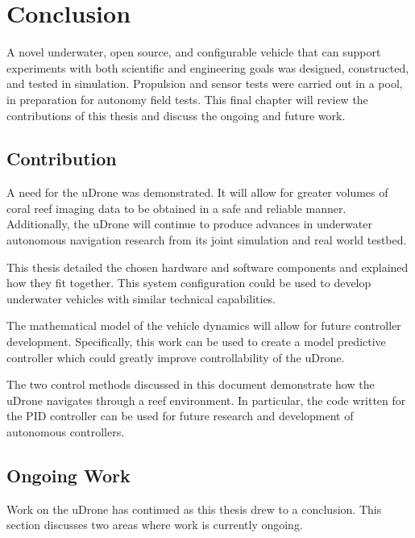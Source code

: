 \chapter{Conclusion}

A novel underwater, open source, and configurable vehicle that can support experiments with both scientific and engineering goals was designed, constructed, and tested in simulation. Propulsion and sensor tests were carried out in a pool, in preparation for autonomy field tests. This final chapter will review the contributions of this thesis and discuss the ongoing and future work. 
\section{Contribution}
A need for the uDrone was demonstrated. It will allow for greater volumes of coral reef imaging data to be obtained in a safe and reliable manner. Additionally, the uDrone will continue to produce advances in underwater autonomous navigation research from its joint simulation and real world testbed.

This thesis detailed the chosen hardware and software components and explained how they fit together. This system configuration could be used to develop underwater vehicles with similar technical capabilities. 

The mathematical model of the vehicle dynamics will allow for future controller development. Specifically, this work can be used to create a model predictive controller which could greatly improve controllability of the uDrone. 

The two control methods discussed in this document demonstrate how the uDrone navigates through a reef environment. In particular, the code written for the PID controller can be used for future research and development of autonomous controllers.

\section{Ongoing Work}

Work on the uDrone has continued as this thesis drew to a conclusion. This section discusses two areas where work is currently ongoing. 

